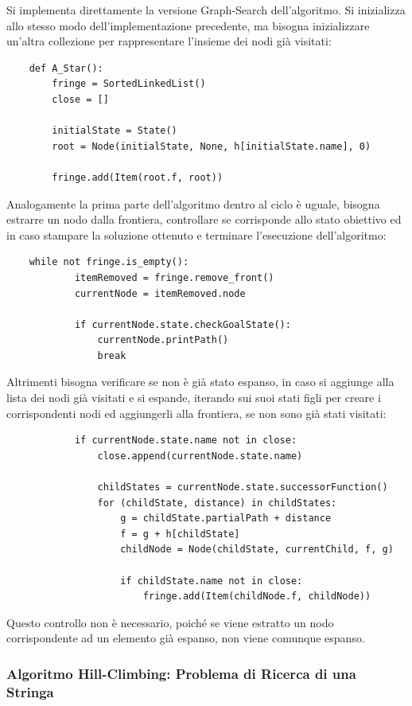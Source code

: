 \documentclass{article}
\numberwithin{equation}{subsection}
\begin{document}
Si implementa direttamente la versione Graph-Search dell'algoritmo. Si inizializza allo 
stesso modo dell'implementazione precedente, ma bisogna inizializzare un'altra collezione 
per rappresentare l'insieme dei nodi già visitati:
\begin{verbatim}
    def A_Star():
        fringe = SortedLinkedList() 
        close = []

        initialState = State()
        root = Node(initialState, None, h[initialState.name], 0)

        fringe.add(Item(root.f, root))
\end{verbatim}

Analogamente la prima parte dell'algoritmo dentro al ciclo è uguale, bisogna estrarre un nodo 
dalla frontiera, controllare se corrisponde allo stato obiettivo ed in caso stampare 
la soluzione ottenuto e terminare l'esecuzione dell'algoritmo:
\begin{verbatim}
    while not fringe.is_empty():
            itemRemoved = fringe.remove_front()
            currentNode = itemRemoved.node

            if currentNode.state.checkGoalState():
                currentNode.printPath()
                break
\end{verbatim}
Altrimenti bisogna verificare se non è già stato espanso, in caso si aggiunge alla lista dei 
nodi già visitati e si espande, iterando sui suoi stati figli per creare i corrispondenti 
nodi ed aggiungerli alla frontiera, se non sono già stati visitati:
\begin{verbatim}
            if currentNode.state.name not in close:
                close.append(currentNode.state.name)

                childStates = currentNode.state.successorFunction()
                for (childState, distance) in childStates:
                    g = childState.partialPath + distance
                    f = g + h[childState]
                    childNode = Node(childState, currentChild, f, g)

                    if childState.name not in close:
                        fringe.add(Item(childNode.f, childNode))
\end{verbatim}
Questo controllo non è necessario, poiché se viene estratto un nodo corrispondente ad un elemento 
già espanso, non viene comunque espanso. 

\subsubsection{Algoritmo Hill-Climbing: Problema di Ricerca di una Stringa}
\end{document}
